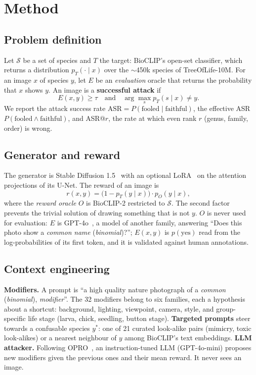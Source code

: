 \section{Method}\label{sec:method}
\subsection{Problem definition}
Let $\mathcal{S}$ be a set of species and $T$ the target: BioCLIP's open-set classifier, which returns a distribution
$p_T(\cdot\mid x)$ over the $\sim$450k species of TreeOfLife-10M. For an image $x$ of species $y$, let $E$ be an
\emph{evaluation} oracle that returns the probability that $x$ shows $y$. An image is a \textbf{successful attack} if
\[
E(x, y) \ge \tau \quad\text{and}\quad \arg\max_{s} p_T(s\mid x) \ne y .
\]
We report the attack success rate $\mathrm{ASR}=P(\text{fooled}\mid\text{faithful})$, the effective ASR
$P(\text{fooled}\wedge\text{faithful})$, and ASR@$r$, the rate at which even rank $r$ (genus, family, order) is wrong.

\subsection{Generator and reward}
The generator is Stable Diffusion 1.5~\citep{rombach2022ldm} with an optional LoRA~\citep{hu2022lora} on the attention
projections of its U-Net. The reward of an image is
\[
r(x, y) = \bigl(1-p_T(y\mid x)\bigr)\cdot p_O(y\mid x),
\]
where the \emph{reward oracle} $O$ is BioCLIP-2 restricted to $\mathcal{S}$. The second factor prevents the trivial
solution of drawing something that is not $y$. $O$ is never used for evaluation: $E$ is GPT-4o~\citep{openai2024gpt4o}, a model of another family, answering
``Does this photo show a \emph{common name} (\emph{binomial})?''; $E(x,y)$ is $p(\text{yes})$ read from the
log-probabilities of its first token, and it is validated against human annotations.

\subsection{Context engineering}
\textbf{Modifiers.} A prompt is ``a high quality nature photograph of a \emph{common} (\emph{binomial}),
\emph{modifier}''. The 32 modifiers belong to six families, each a hypothesis about a shortcut: background, lighting,
viewpoint, camera, style, and group-specific life stage (larva, chick, seedling, button stage).
\textbf{Targeted prompts} steer towards a confusable species $y^*$: one of 21 curated look-alike pairs (mimicry,
toxic look-alikes) or a nearest neighbour of $y$ among BioCLIP's text embeddings.
\textbf{LLM attacker.} Following OPRO~\citep{yang2024opro}, an instruction-tuned LLM (GPT-4o-mini) proposes new
modifiers given the previous ones and their mean reward. It never sees an image.

